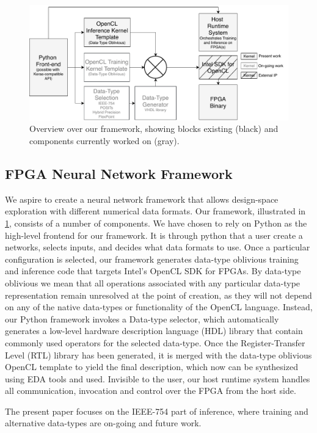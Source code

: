 \documentclass[techrep,english]{ipsj} %
\begin{document}
\begin{figure}[p]
  \centering
  \includegraphics[width=0.7\linewidth]{training_overview.pdf}
  \caption{Overview over our framework, showing blocks existing (black) and components currently worked on (gray).}\label{fig:overview}
\end{figure}

\subsection{FPGA Neural Network Framework}
We aspire to create a neural network framework that allows design-space exploration with different numerical data formats.
Our framework, illustrated in \cref{fig:overview}, consists of a number of components.
We have chosen to rely on Python as the high-level frontend for our framework.
It is through python that a user create a networks, selects inputs, and decides what data formats to use.
Once a particular configuration is selected, our framework generates data-type oblivious training and inference code that targets Intel's OpenCL SDK for FPGAs.
By data-type oblivious we mean that all operations associated with any particular data-type representation remain unresolved at the point of creation, as they will not depend on any of the native data-types or functionality of the OpenCL language.
Instead, our Python framework invokes a Data-type selector, which automatically generates a low-level hardware description language (HDL) library that contain commonly used operators for the selected data-type.
Once the Register-Transfer Level (RTL) library has been generated, it is merged with the data-type oblivious OpenCL template to yield the final description, which now can be synthesized using EDA tools and used.
Invisible to the user, our host runtime system handles all communication, invocation and control over the FPGA from the host side.

The present paper focuses on the IEEE-754 part of inference, where training and alternative data-types are on-going and future work.
\end{document}
